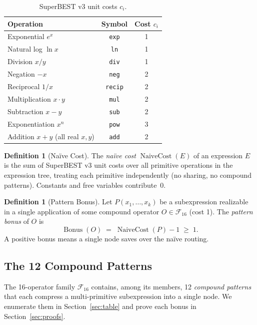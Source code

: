 \documentclass[12pt,a4paper]{article}
\theoremstyle{definition}
\newtheorem{definition}[theorem]{Definition}
\newcommand{\NC}{\operatorname{NaiveCost}}
\newcommand{\Bonus}{\operatorname{Bonus}}
\begin{document}
\begin{table}[h]
\centering
\caption{SuperBEST v3 unit costs $c_i$.}
\label{tab:unit}
\smallskip
\begin{tabular}{@{}lcc@{}}
\toprule
\textbf{Operation} & \textbf{Symbol} & \textbf{Cost $c_i$} \\
\midrule
Exponential $e^x$              & \texttt{exp}   & 1 \\
Natural log $\ln x$            & \texttt{ln}    & 1 \\
Division $x/y$                 & \texttt{div}   & 1 \\
Negation $-x$                  & \texttt{neg}   & 2 \\
Reciprocal $1/x$               & \texttt{recip} & 2 \\
Multiplication $x \cdot y$     & \texttt{mul}   & 2 \\
Subtraction $x - y$            & \texttt{sub}   & 2 \\
Exponentiation $x^n$           & \texttt{pow}   & 3 \\
Addition $x+y$ (all real $x,y$) & \texttt{add}   & 2 \\
\bottomrule
\end{tabular}
\end{table}

\begin{definition}[Na\"{i}ve Cost]
\label{def:NC}
The \emph{na\"{i}ve cost} $\NC(E)$ of an expression $E$ is the sum of
SuperBEST v3 unit costs over all primitive operations in the expression
tree, treating each primitive independently (no sharing, no compound
patterns).  Constants and free variables contribute~0.
\end{definition}

\begin{definition}[Pattern Bonus]
\label{def:bonus}
Let $P(x_1,\ldots,x_k)$ be a subexpression realizable in a single
application of some compound operator $O \in \mathcal{F}_{16}$ (cost 1).
The \emph{pattern bonus} of $O$ is
\[
  \Bonus(O) \;=\; \NC(P) - 1 \;\geq\; 1.
\]
A positive bonus means a single node saves over the na\"{i}ve routing.
\end{definition}

\subsection{The 12 Compound Patterns}

The 16-operator family $\mathcal{F}_{16}$ contains, among its members,
12 \emph{compound patterns} that each compress a multi-primitive
subexpression into a single node.  We enumerate them in
Section~\ref{sec:table} and prove each bonus in Section~\ref{sec:proofs}.
\end{document}
